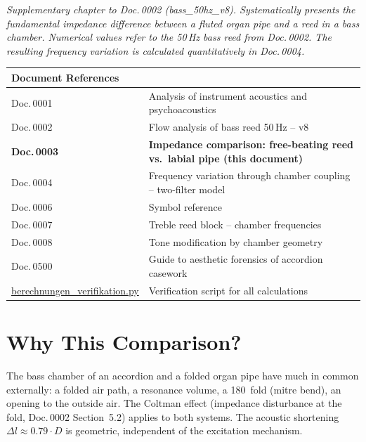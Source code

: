 \documentclass[11pt,a4paper]{article}
\begin{document}
\hbmaketitle

{\small\itshape Supplementary chapter to Doc.\,0002 (bass\_50hz\_v8). Systematically presents the fundamental impedance difference between a fluted organ pipe and a reed in a bass chamber. Numerical values refer to the 50\,Hz bass reed from Doc.\,0002. The resulting frequency variation is calculated quantitatively in Doc.\,0004.}

\vspace{2mm}
\begin{center}\small
\begin{tabularx}{\textwidth}{l X}
\hbtoprule
\textbf{Document References} \\
\midrule
Doc.\,0001 & Analysis of instrument acoustics and psychoacoustics \\
Doc.\,0002 & Flow analysis of bass reed 50\,Hz -- v8 \\
\textbf{Doc.\,0003} & \textbf{Impedance comparison: free-beating reed vs.\ labial pipe (this document)} \\
Doc.\,0004 & Frequency variation through chamber coupling -- two-filter model \\
Doc.\,0006 & Symbol reference \\
Doc.\,0007 & Treble reed block -- chamber frequencies \\
Doc.\,0008 & Tone modification by chamber geometry \\
Doc.\,0500 & Guide to aesthetic forensics of accordion casework \\
\midrule
\href{berechnungen_verifikation.py}{berechnungen\_verifikation.py} & Verification script for all calculations \\
\bottomrule
\end{tabularx}
\end{center}

\vspace{4mm}

\section{Why This Comparison?}

The bass chamber of an accordion and a folded organ pipe have much in common externally: a folded air path, a resonance volume, a 180\textdegree\ fold (mitre bend), an opening to the outside air. The Coltman effect (impedance disturbance at the fold, Doc.\,0002 Section~5.2) applies to both systems. The acoustic shortening $\Delta l \approx 0{.}79 \cdot D$ is geometric, independent of the excitation mechanism.
\end{document}
